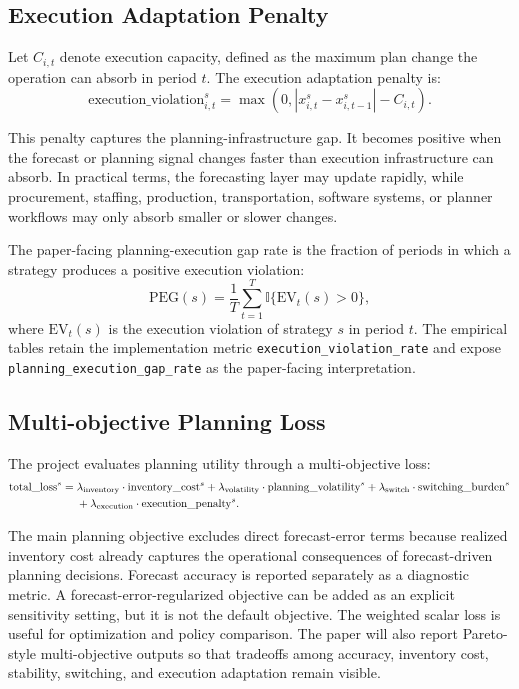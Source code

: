 \subsection{Execution Adaptation Penalty}

Let $C_{i,t}$ denote execution capacity, defined as the maximum plan change the operation can absorb in period $t$. The execution adaptation penalty is:
\begin{equation}
    \mathrm{execution\_violation}_{i,t}^{s}
    =
    \max\left(0, |x_{i,t}^{s} - x_{i,t-1}^{s}| - C_{i,t}\right).
\end{equation}

This penalty captures the planning-infrastructure gap. It becomes positive when the forecast or planning signal changes faster than execution infrastructure can absorb. In practical terms, the forecasting layer may update rapidly, while procurement, staffing, production, transportation, software systems, or planner workflows may only absorb smaller or slower changes.

The paper-facing planning-execution gap rate is the fraction of periods in which a strategy produces a positive execution violation:
\begin{equation}
    \mathrm{PEG}(s)
    =
    \frac{1}{T}
    \sum_{t=1}^{T}
    \mathbb{I}\{\mathrm{EV}_{t}(s) > 0\},
\end{equation}
where $\mathrm{EV}_{t}(s)$ is the execution violation of strategy $s$ in period $t$. The empirical tables retain the implementation metric \texttt{execution\_violation\_rate} and expose \texttt{planning\_execution\_gap\_rate} as the paper-facing interpretation.

\subsection{Multi-objective Planning Loss}

The project evaluates planning utility through a multi-objective loss:
\begin{align}
    \mathrm{total\_loss}^{s}
    ={}&
    \lambda_{\mathrm{inventory}} \cdot \mathrm{inventory\_cost}^{s}
    + \lambda_{\mathrm{volatility}} \cdot \mathrm{planning\_volatility}^{s}
    + \lambda_{\mathrm{switch}} \cdot \mathrm{switching\_burden}^{s} \notag \\
    &+ \lambda_{\mathrm{execution}} \cdot \mathrm{execution\_penalty}^{s}.
\end{align}

The main planning objective excludes direct forecast-error terms because realized inventory cost already captures the operational consequences of forecast-driven planning decisions. Forecast accuracy is reported separately as a diagnostic metric. A forecast-error-regularized objective can be added as an explicit sensitivity setting, but it is not the default objective. The weighted scalar loss is useful for optimization and policy comparison. The paper will also report Pareto-style multi-objective outputs so that tradeoffs among accuracy, inventory cost, stability, switching, and execution adaptation remain visible.


